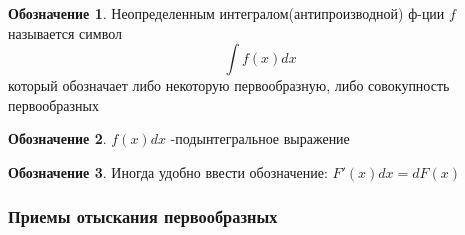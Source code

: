 \documentclass[a4paper]{article}
\theoremstyle{definition}
\newtheorem*{name}{Обозначение}
\newtheorem*{comment}{Замечание}
\numberwithin{theorem}{subsection}
\numberwithin{lemma}{subsection}
\numberwithin{definition}{subsection}
\numberwithin{comment*}{subsection}
\numberwithin{consequence}{subsection}
\numberwithin{property}{subsection}
\begin{document}
\begin{name}
 Неопределенным интегралом(антипроизводной) ф-ции $f$ называется символ $$\int f(x) dx$$ который обозначает либо некоторую первообразную, либо совокупность первообразных
\end{name}
\begin{name}
 $f(x) dx$ -подынтегральное выражение
\end{name}
\begin{name}
 Иногда удобно ввести обозначение: $F'(x)dx = dF(x)$
\end{name}

\subsubsection{Приемы отыскания первообразных}
\end{document}
